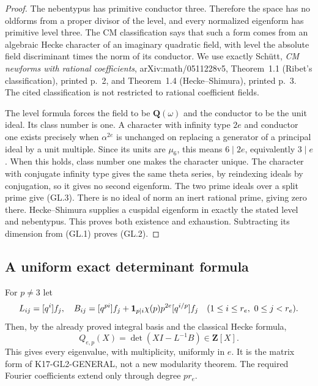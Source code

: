 \begin{proof}
The nebentypus has primitive conductor three. Therefore the space
has no oldforms from a proper divisor of the level, and every
normalized eigenform has primitive level three.
The CM classification says that such a form comes from an
algebraic Hecke character of an imaginary quadratic field, with
level the absolute field discriminant times the norm of its
conductor. We use exactly Sch\"utt,
\emph{CM newforms with rational coefficients},
arXiv:math/0511228v5, Theorem~1.1 (Ribet's classification),
printed p.~2, and Theorem~1.4 (Hecke--Shimura),
printed p.~3. The cited classification is not restricted to
rational coefficient fields.

The level formula forces the field to be $\mathbf Q(\omega)$
and the conductor to be the unit ideal. Its class number is one.
A character with infinity type $2e$ and conductor one exists
precisely when $\alpha^{2e}$ is unchanged on replacing a generator
of a principal ideal by a unit multiple. Since its units are
$\mu_6$, this means $6\mid2e$, equivalently $3\mid e$.
When this holds, class number one makes the character unique.
The character with conjugate infinity type gives the same theta
series, by reindexing ideals by conjugation, so it gives no second
eigenform. The two prime ideals over a split prime give (GL.3).
There is no ideal of norm an inert rational prime, giving zero
there. Hecke--Shimura supplies a cuspidal eigenform in exactly
the stated level and nebentypus. This proves both existence and
exhaustion. Subtracting its dimension from (GL.1) proves (GL.2).
\end{proof}

\subsection{A uniform exact determinant formula}

For $p\ne3$ let
\[
 L_{ij}=[q^i]f_j,\quad
 B_{ij}=[q^{pi}]f_j+
       {\bf1}_{p\mid i}\chi(p)p^{2e}[q^{i/p}]f_j
 \quad(1\leq i\leq r_e,\ 0\leq j<r_e).
\]
Then, by the already proved integral basis and the classical
Hecke formula,
\[
       Q_{e,p}(X)=\det(XI-L^{-1}B)\in\mathbf Z[X].
 \tag{GL.4}
\]
This gives every eigenvalue, with multiplicity, uniformly in $e$.
It is the matrix form of K17-GL2-GENERAL, not a new modularity
theorem. The required Fourier coefficients extend only through
degree $pr_e$.

